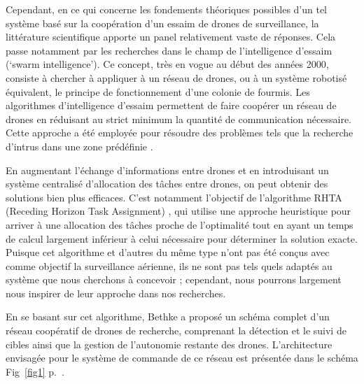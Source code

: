 \documentclass[12pt, openany]{article}
\begin{document}
Cependant, en ce qui concerne les fondements théoriques possibles d’un tel système basé sur la coopération d’un essaim de drones de surveillance, la littérature scientifique apporte un panel relativement vaste de réponses. Cela passe notamment par les recherches dans le champ de l’intelligence d’essaim (‘swarm intelligence’). Ce concept, très en vogue au début des années 2000, consiste à chercher à appliquer à un réseau de drones, ou à un système robotisé équivalent, le principe de fonctionnement d’une colonie de fourmis. Les algorithmes d’intelligence d’essaim permettent de faire coopérer un réseau de drones en réduisant au strict minimum la quantité de communication nécessaire. Cette approche a été employée pour résoudre des problèmes tels que la recherche d’intrus dans une zone prédéfinie \cite{2}.

En augmentant l’échange d’informations entre drones et en introduisant un système centralisé d’allocation des tâches entre drones, on peut obtenir des solutions bien plus efficaces. C’est notamment l’objectif de l’algorithme RHTA (Receding Horizon Task Assignment)\cite{3}  , qui utilise une approche heuristique pour arriver à une allocation des tâches proche de l’optimalité tout en ayant un temps de calcul largement inférieur à celui nécessaire pour déterminer la solution exacte. Puisque cet algorithme et d’autres du même type n’ont pas été conçus avec comme objectif la surveillance aérienne, ils ne sont pas tels quels adaptés au système que nous cherchons à concevoir ; cependant, nous pourrons largement nous inspirer de leur approche dans nos recherches.

En se basant sur cet algorithme, Bethke \cite{4}  a proposé un schéma complet d’un réseau coopératif de drones de recherche, comprenant la détection et le suivi de cibles ainsi que la gestion de l’autonomie restante des drones. L’architecture envisagée pour le système de commande de ce réseau est présentée dans le schéma Fig~\ref{fig1} p.~\pageref{fig1}.
\end{document}
